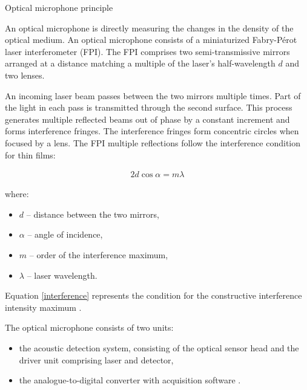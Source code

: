 \smallskip
Optical microphone principle

An optical microphone is directly measuring the changes in the density of the optical medium. An optical microphone consists of a miniaturized Fabry-Pérot laser interferometer (FPI). The FPI comprises two semi-transmissive mirrors arranged at a distance matching a multiple of the laser’s half-wavelength $d$ and two lenses.

An incoming laser beam passes between the two mirrors multiple times. Part of the light in each pass is transmitted through the second surface. This process generates multiple reflected beams out of phase by a constant increment and forms interference fringes. The interference fringes form concentric circles when focused by a lens. The FPI multiple reflections follow the interference condition for thin films:

\begin{gather} \label{interference}
2d\cos\alpha = m\lambda
\end{gather} 

where:

\begin{itemize}

    \item $d$ -- distance between the two mirrors,
    \item $\alpha$ -- angle of incidence,
    \item $m$ -- order of the interference maximum,
    \item $\lambda$ -- laser wavelength.
    
\end{itemize}


Equation \ref{interference} represents the condition for the constructive interference intensity maximum \cite{fpi}.

 The optical microphone consists of two units:
 
\begin{itemize}
 
    \item the acoustic detection system, consisting of the optical sensor head and the driver unit comprising laser and detector,

    \item the analogue-to-digital converter with acquisition software \cite{fischer_rohringer_panzer_hecker_2017}.

\end{itemize}

